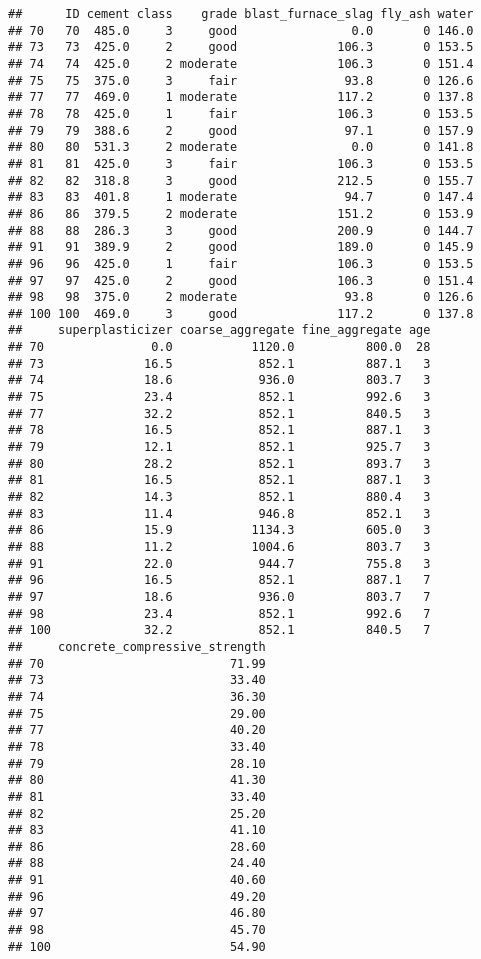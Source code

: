 \documentclass[]{article}
\begin{document}
\begin{verbatim}
##      ID cement class    grade blast_furnace_slag fly_ash water
## 70   70  485.0     3     good                0.0       0 146.0
## 73   73  425.0     2     good              106.3       0 153.5
## 74   74  425.0     2 moderate              106.3       0 151.4
## 75   75  375.0     3     fair               93.8       0 126.6
## 77   77  469.0     1 moderate              117.2       0 137.8
## 78   78  425.0     1     fair              106.3       0 153.5
## 79   79  388.6     2     good               97.1       0 157.9
## 80   80  531.3     2 moderate                0.0       0 141.8
## 81   81  425.0     3     fair              106.3       0 153.5
## 82   82  318.8     3     good              212.5       0 155.7
## 83   83  401.8     1 moderate               94.7       0 147.4
## 86   86  379.5     2 moderate              151.2       0 153.9
## 88   88  286.3     3     good              200.9       0 144.7
## 91   91  389.9     2     good              189.0       0 145.9
## 96   96  425.0     1     fair              106.3       0 153.5
## 97   97  425.0     2     good              106.3       0 151.4
## 98   98  375.0     2 moderate               93.8       0 126.6
## 100 100  469.0     3     good              117.2       0 137.8
##     superplasticizer coarse_aggregate fine_aggregate age
## 70               0.0           1120.0          800.0  28
## 73              16.5            852.1          887.1   3
## 74              18.6            936.0          803.7   3
## 75              23.4            852.1          992.6   3
## 77              32.2            852.1          840.5   3
## 78              16.5            852.1          887.1   3
## 79              12.1            852.1          925.7   3
## 80              28.2            852.1          893.7   3
## 81              16.5            852.1          887.1   3
## 82              14.3            852.1          880.4   3
## 83              11.4            946.8          852.1   3
## 86              15.9           1134.3          605.0   3
## 88              11.2           1004.6          803.7   3
## 91              22.0            944.7          755.8   3
## 96              16.5            852.1          887.1   7
## 97              18.6            936.0          803.7   7
## 98              23.4            852.1          992.6   7
## 100             32.2            852.1          840.5   7
##     concrete_compressive_strength
## 70                          71.99
## 73                          33.40
## 74                          36.30
## 75                          29.00
## 77                          40.20
## 78                          33.40
## 79                          28.10
## 80                          41.30
## 81                          33.40
## 82                          25.20
## 83                          41.10
## 86                          28.60
## 88                          24.40
## 91                          40.60
## 96                          49.20
## 97                          46.80
## 98                          45.70
## 100                         54.90
\end{verbatim}
\end{document}
